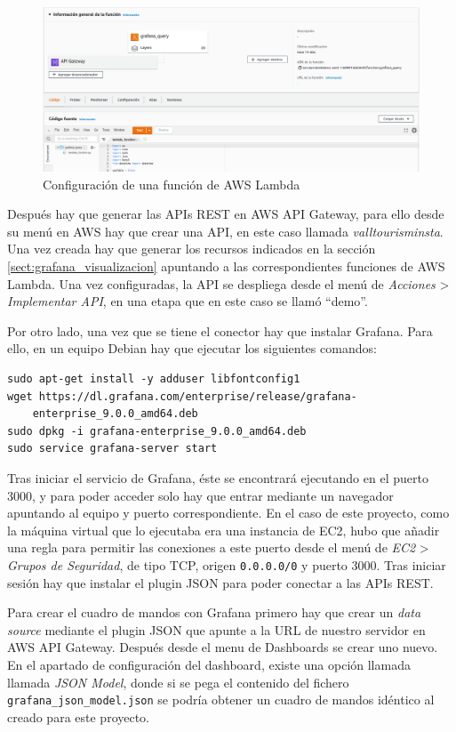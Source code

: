 \begin{figure}[H]
    \hspace*{-2cm}
    \centering
    \includegraphics[width=1.2\textwidth]{memoria/img/lambda.png}
    \caption{Configuración de una función de AWS Lambda}
    \label{fig:aws_lambda}
\end{figure}

Después hay que generar las APIs REST en AWS API Gateway, para ello desde su menú en AWS hay que crear una API, en este caso llamada \textit{valltourisminsta}. Una vez creada hay que generar los recursos indicados en la sección \ref{sect:grafana_visualizacion} apuntando a las correspondientes funciones de AWS Lambda. Una vez configuradas, la API se despliega desde el menú de \textit{Acciones} > \textit{Implementar API}, en una etapa que en este caso se llamó ``demo''.

Por otro lado, una vez que se tiene el conector hay que instalar Grafana. Para ello, en un equipo Debian hay que ejecutar los siguientes comandos:

\begin{verbatim}
sudo apt-get install -y adduser libfontconfig1
wget https://dl.grafana.com/enterprise/release/grafana-
    enterprise_9.0.0_amd64.deb
sudo dpkg -i grafana-enterprise_9.0.0_amd64.deb
sudo service grafana-server start
\end{verbatim}

Tras iniciar el servicio de Grafana, éste se encontrará ejecutando en el puerto 3000, y para poder acceder solo hay que entrar mediante un navegador apuntando al equipo y puerto correspondiente. En el caso de este proyecto, como la máquina virtual que lo ejecutaba era una instancia de EC2, hubo que añadir una regla para permitir las conexiones a este puerto desde el menú de \textit{EC2} > \textit{Grupos de Seguridad}, de tipo TCP, origen \texttt{0.0.0.0/0} y puerto 3000. Tras iniciar sesión hay que instalar el plugin JSON para poder conectar a las APIs REST.

Para crear el cuadro de mandos con Grafana primero hay que crear un \textit{data source} mediante el plugin JSON que apunte a la URL de nuestro servidor en AWS API Gateway. Después desde el menu de Dashboards se crear uno nuevo. En el apartado de configuración del dashboard, existe una opción llamada llamada \textit{JSON Model}, donde si se pega el contenido del fichero \texttt{grafana\_json\_model.json} se podría obtener un cuadro de mandos idéntico al creado para este proyecto.

